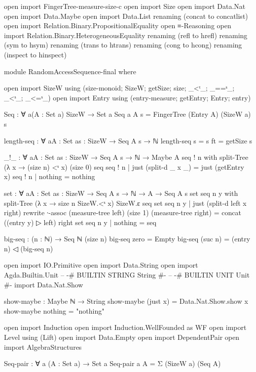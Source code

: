 open import FingerTree-measure-size-c
open import Size
open import Data.Nat
open import Data.Maybe
open import Data.List renaming (concat to concatlist)
open import Relation.Binary.PropositionalEquality
open ≡-Reasoning
open import Relation.Binary.HeterogeneousEquality renaming (refl to hrefl) renaming (sym to hsym) renaming (trans to htrans) renaming (cong to hcong) renaming (inspect to hinspect)

module RandomAccessSequence-final where

    open import SizeW using (size-monoid; SizeW; getSize; size; _<ᵗ_; _==ˢ_; _<ˢ_; _<=ˢ_)
    open import Entry using (entry-measure; getEntry; Entry; entry)

    Seq : ∀ {a}(A : Set a) SizeW → Set a
    Seq {a} A s = FingerTree (Entry A) (SizeW {a}) {s}

    length-seq : ∀ {a}{A : Set a}{s : SizeW} → Seq A s → ℕ
    length-seq {s = s} ft = getSize s

    _!_ : ∀ {a}{A : Set a}{s : SizeW} → Seq A s → ℕ → Maybe A
    seq ! n with split-Tree (λ x → (size n) <ˢ x) (size 0) seq
    seq ! n | just (split-d _ x _) = just (getEntry x)
    seq ! n | nothing = nothing

    set : ∀ {a}{A : Set a}{s : SizeW} → Seq A s → ℕ → A → Seq A s
    set seq n y with split-Tree (λ x → size n SizeW.<ˢ x) SizeW.ε seq
    set seq n y | just (split-d left x right)
      rewrite ∙-assoc (measure-tree left)
                      (size 1)
                      (measure-tree right)
      = concat ((entry y) ▷ left) right
    set seq n y | nothing = seq

    big-seq : (n : ℕ) → Seq ℕ (size n)
    big-seq zero = Empty
    big-seq (suc n) = (entry n) ◁ (big-seq n)

    open import IO.Primitive
    open import Data.String
    open import Agda.Builtin.Unit
    -- {-# BUILTIN STRING String #-}
    -- {-# BUILTIN UNIT Unit #-}
    import Data.Nat.Show

    show-maybe : Maybe ℕ → String
    show-maybe (just x) = Data.Nat.Show.show x
    show-maybe nothing = "nothing"



    open import Induction
    open import Induction.WellFounded as WF
    open import Level using (Lift)
    open import Data.Empty
    open import DependentPair
    open import AlgebraStructures

    Seq-pair : ∀ {a} (A : Set a) → Set a
    Seq-pair {a} A = Σ (SizeW {a}) (Seq A)

